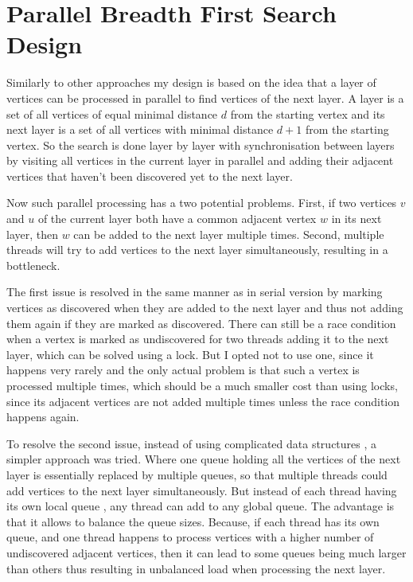 \documentclass{report}
\theoremstyle{plain}
\theoremstyle{definition}
\theoremstyle{remark}
\begin{document}
\section{Parallel Breadth First Search Design}

Similarly to other approaches my design is based on the idea that a layer of vertices can be processed in parallel to find vertices of the next layer. A layer is a set of all vertices of equal minimal distance $d$ from the starting vertex and its next layer is a set of all vertices with minimal distance $d + 1$ from the starting vertex. So the search is done layer by layer with synchronisation between layers by visiting all vertices in the current layer in parallel and adding their adjacent vertices that haven't been discovered yet to the next layer.

Now such parallel processing has a two potential problems. First, if two vertices $v$ and $u$ of the current layer both have a common adjacent vertex $w$ in its next layer, then $w$ can be added to the next layer multiple times. Second, multiple threads will try to add vertices to the next layer simultaneously, resulting in a bottleneck.

The first issue is resolved in  the same manner as in serial version by marking vertices as discovered when they are added to the next layer and thus not adding them again if they are marked as discovered. There can still be a race condition when a vertex is marked as undiscovered for two threads adding it to the next layer, which can be solved using a lock. But I opted not to use one, since it happens very rarely and the only actual problem is that such a vertex is processed multiple times, which should be a much smaller cost than using locks, since its adjacent vertices are not added multiple times unless the race condition happens again.

To resolve the second issue, instead of using complicated data structures \cite{Leiserson}, a simpler approach was tried. Where one queue holding all the vertices of the next layer is essentially replaced by multiple queues, so that multiple threads could add vertices to the next layer simultaneously. But instead of each thread having its own local queue \cite{cong2008solving, zhang2006parallel}, any thread can add to any global queue. The advantage is that it allows to balance the queue sizes. Because, if each thread has its own queue, and one thread happens to process vertices with a higher number of undiscovered adjacent vertices, then it can lead to some queues being much larger than others thus resulting in unbalanced load when processing the next layer.
\end{document}
